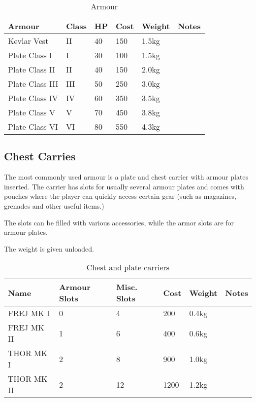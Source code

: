 \begin{table}
  \caption{Armour}
  \label{tab:Armour}
  \begin{center}
    \begin{tabular}{| l | l | l | l | l | l |}

      \hline
      \textbf{Armour} & \textbf{Class} & \textbf{HP} &
      \textbf{Cost} & \textbf{Weight} & \textbf{Notes} \\ \hline

      Kevlar Vest     &  II & 40 & 150 & 1.5kg & \\ \hline
      Plate Class I   &   I & 30 & 100 & 1.5kg & \\ \hline
      Plate Class II  &  II & 40 & 150 & 2.0kg & \\ \hline
      Plate Class III & III & 50 & 250 & 3.0kg & \\ \hline
      Plate Class IV  &  IV & 60 & 350 & 3.5kg & \\ \hline
      Plate Class V   &   V & 70 & 450 & 3.8kg & \\ \hline
      Plate Class VI  &  VI & 80 & 550 & 4.3kg & \\ \hline

    \end{tabular}
  \end{center}
\end{table}

\subsection{Chest Carries}
\label{sub:9-Chest Carries}

The most commonly used armour is a plate and chest carrier with armour plates
inserted. The carrier has slots for usually several armour plates and comes
with pouches where the player can quickly access certain gear (such as
magazines, grenades and other useful items.)

The slots can be filled with various accessories, while the armor slots are
for armour plates.

The weight is given unloaded.

\begin{table}
  \caption{Chest and plate carriers}
  \label{tab:Carriers}
  \begin{center}
    \begin{tabular}{| l | l | l | l | l | l |}

      \hline
      \textbf{Name} & \textbf{Armour Slots} & \textbf{Misc. Slots} &
      \textbf{Cost} & \textbf{Weight} & \textbf{Notes} \\ \hline

      FREJ MK I   & 0 &  4 &  200 & 0.4kg & \\ \hline
      FREJ MK II  & 1 &  6 &  400 & 0.6kg & \\ \hline

      THOR MK I   & 2 &  8 &  900 & 1.0kg & \\ \hline
      THOR MK II  & 2 & 12 & 1200 & 1.2kg & \\ \hline

    \end{tabular}
  \end{center}
\end{table}

